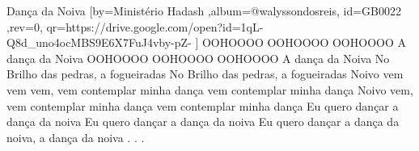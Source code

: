 \beginsong
{Dança da Noiva %
}[by={Ministério Hadash %
},album={@walyssondosreis},
id={GB0022 %
},rev={0}, %
qr={https://drive.google.com/open?id=1qL-Q8d_uno4ocMBS9E6X7FuJ4vby-pZ- %
}]
\beginverse*
OOHOOOO OOHOOOO OOHOOOO A dança da Noiva
OOHOOOO OOHOOOO OOHOOOO A dança da Noiva
\endverse
\beginverse*
No Brilho das pedras, a fogueiradas
No Brilho das pedras, a fogueiradas
\endverse
\beginverse*
Noivo vem vem vem, vem contemplar minha dança
vem contemplar minha dança
Noivo vem, vem contemplar minha dança
vem contemplar minha dança
\endverse
\beginchorus
Eu quero dançar a dança da noiva
Eu quero dançar a dança da noiva
Eu quero dançar a dança da noiva, a dança da noiva
\endchorus
\beginverse*\color{white}
.
.
.
\endverse

